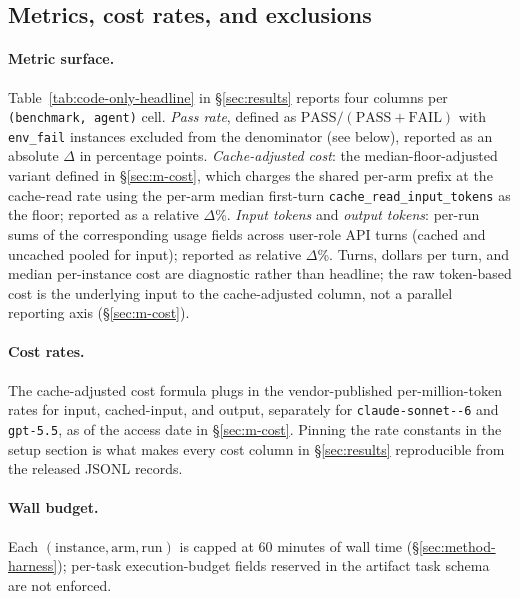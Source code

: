 \subsection{Metrics, cost rates, and exclusions}
\label{sec:setup-metrics}

\paragraph{Metric surface.} Table~\ref{tab:code-only-headline} in
\S\ref{sec:results} reports four columns per \texttt{(benchmark, agent)}
cell. \emph{Pass rate}, defined as $\mathrm{PASS} / (\mathrm{PASS} +
\mathrm{FAIL})$ with \texttt{env\_fail} instances excluded from the
denominator (see below), reported as an absolute $\Delta$ in
percentage points. \emph{Cache-adjusted cost}: the
median-floor-adjusted variant defined in \S\ref{sec:m-cost}, which
charges the shared per-arm prefix at the cache-read rate using the
per-arm median first-turn \texttt{cache\allowbreak\_read\allowbreak\_input\allowbreak\_tokens} as the
floor; reported as a relative $\Delta$\%. \emph{Input tokens} and
\emph{output tokens}: per-run sums of the corresponding usage fields
across user-role API turns (cached and uncached pooled for input);
reported as relative $\Delta$\%. Turns, dollars per turn, and median
per-instance cost are diagnostic rather than headline; the raw token-based
cost is the underlying input to the cache-adjusted column, not a
parallel reporting axis (\S\ref{sec:m-cost}).

\paragraph{Cost rates.} The cache-adjusted cost formula plugs in the
vendor-published per-million-token rates for input, cached-input, and
output, separately for \texttt{claude-\allowbreak sonnet--6} and \texttt{gpt-5.5},
as of the access date in \S\ref{sec:m-cost}. Pinning the rate constants
in the setup section is what makes every cost column in
\S\ref{sec:results} reproducible from the released JSONL records.

\paragraph{Wall budget.} Each $(\text{instance}, \text{arm}, \text{run})$
is capped at 60 minutes of wall time (\S\ref{sec:method-harness});
per-task execution-budget fields reserved in the artifact task schema
are not enforced.

